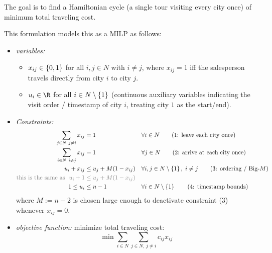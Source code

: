 \documentclass[a4paper, 11pt]{report}
\begin{document}
The goal is to find a Hamiltonian cycle (a single tour visiting every city once) of minimum total traveling cost.

This formulation models this as a MILP as follows:
\begin{itemize}
    \item \textit{variables:}
    \begin{itemize}
        \item $x_{ij} \in \set{0,1}$ for all $i,j \in N$ with $i \neq j$, where $x_{ij} = 1$ iff the salesperson travels directly from city $i$ to city $j$.
        \item $u_i \in \R$ for all $i \in N \setminus \set{1}$ (continuous auxiliary variables indicating the visit order / timestamp of city $i$, treating city $1$ as the start/end).
    \end{itemize}
    


    \item \textit{Constraints:}
    \begin{align*}
        \sum_{j \in N, \, j \neq i} x_{ij} &= 1 && \forall i \in N \tag{1: leave each city once} \\
        \sum_{i \in N, \, i \neq j} x_{ij} &= 1 && \forall j \in N \tag{2: arrive at each city once} \\
        u_i + x_{ij} &\leq u_j + M(1 - x_{ij}) && \forall i,j \in N \setminus \set{1}, \; i \neq j \tag{3: ordering / Big-$M$} \\
        \color{gray} \text{this is the same as } \ u_i + 1 & \color{gray}\leq u_j + M(1 - x_{ij}) \\
        1 \leq u_i &\leq n - 1 && \forall i \in N \setminus \set{1} \tag{4: timestamp bounds}
    \end{align*}
    where $M := n - 2$ is chosen large enough to deactivate constraint (3) whenever $x_{ij} = 0$.
 \item \textit{objective function:} minimize total traveling cost:
    $$ \min \sum_{i \in N} \sum_{j \in N, \, j \neq i} c_{ij} x_{ij} $$
\end{itemize}
\end{document}
